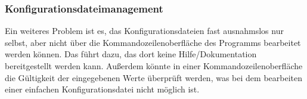   \subsubsection{Konfigurationsdateimanagement}
  Ein weiteres Problem ist es, das Konfigurationsdateien fast ausnahmslos nur selbst, aber nicht über die
  Kommandozeilenoberfläche des Programms bearbeitet werden können.
  Das führt dazu, das dort keine Hilfe/Dokumentation bereitgestellt werden kann.
  Au\ss erdem könnte in einer Kommandozeilenoberfläche die Gültigkeit der eingegebenen Werte
  überprüft werden, was bei dem bearbeiten einer einfachen Konfigurationsdatei nicht möglich ist.